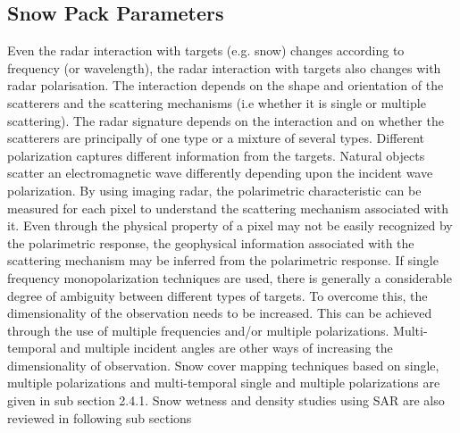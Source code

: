\subsection*{Snow Pack Parameters}
Even the radar interaction with targets (e.g. snow) changes according to frequency (or wavelength), the radar interaction with targets also changes with radar polarisation. The interaction depends on the shape and orientation of the scatterers and the scattering mechanisms (i.e whether it is single or multiple scattering). The radar signature depends on the interaction and on whether the scatterers are principally of one type or a mixture of several types. Different polarization captures different information from the targets. Natural objects scatter an electromagnetic wave differently depending upon the incident wave polarization. By using imaging radar, the polarimetric characteristic can be measured for each pixel to understand the scattering mechanism associated with it. Even through the physical property of a pixel may not be easily recognized by the polarimetric response, the geophysical information associated with the scattering mechanism may be inferred from the polarimetric response. If single frequency monopolarization techniques are used, there is generally a considerable degree of ambiguity between different types of targets. To overcome this, the dimensionality of the observation needs to be increased. This can be achieved through the use of multiple frequencies and/or multiple polarizations. Multi-temporal and multiple incident angles are other ways of increasing the dimensionality of observation.  Snow cover mapping techniques based on single, multiple polarizations and multi-temporal single and multiple polarizations are given in sub section 2.4.1. Snow wetness and density studies using SAR are also reviewed in following sub sections
